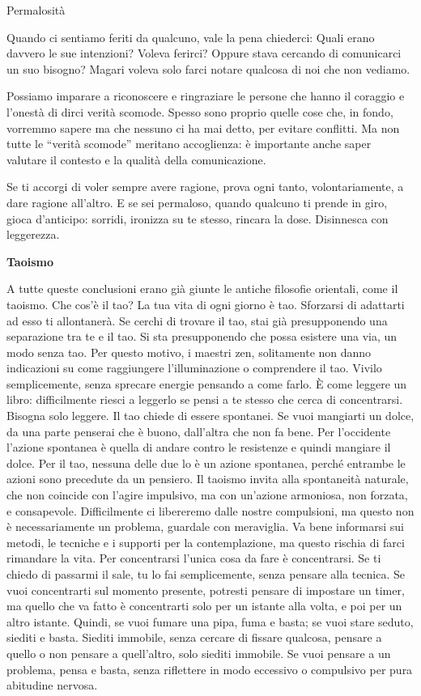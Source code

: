 \documentclass[12pt]{book} %
\begin{document}
\begin{mdframed}[linewidth=1pt]
Permalosità

Quando ci sentiamo feriti da qualcuno, vale la pena chiederci: Quali erano davvero le sue intenzioni?
Voleva ferirci? Oppure stava cercando di comunicarci un suo bisogno? Magari voleva solo farci notare qualcosa di noi che non vediamo.

Possiamo imparare a riconoscere e ringraziare le persone che hanno il coraggio e l’onestà di dirci verità scomode. Spesso sono proprio quelle cose che, in fondo, vorremmo sapere ma che nessuno ci ha mai detto, per evitare conflitti. Ma non tutte le “verità scomode” meritano accoglienza: è importante anche saper valutare il contesto e la qualità della comunicazione.

Se ti accorgi di voler sempre avere ragione, prova ogni tanto, volontariamente, a dare ragione all’altro.
E se sei permaloso, quando qualcuno ti prende in giro, gioca d’anticipo: sorridi, ironizza su te stesso, rincara la dose. Disinnesca con leggerezza.
\end{mdframed}

\textbf{Taoismo}

A tutte queste conclusioni erano già giunte le antiche filosofie orientali, come il taoismo.
Che cos'è il tao? La tua vita di ogni giorno è tao. Sforzarsi di adattarti ad esso ti allontanerà. Se cerchi di trovare il tao, stai già presupponendo una separazione tra te e il tao. Si sta presupponendo che possa esistere una via, un modo senza tao. Per questo motivo, i maestri zen, solitamente non danno indicazioni su come raggiungere l'illuminazione o comprendere il tao. Vivilo semplicemente, senza sprecare energie pensando a come farlo. È come leggere un libro: difficilmente riesci a leggerlo se pensi a te stesso che cerca di concentrarsi. Bisogna solo leggere.
Il tao chiede di essere spontanei. Se vuoi mangiarti un dolce, da una parte penserai che è buono, dall'altra che non fa bene. Per l'occidente l'azione spontanea è quella di andare contro le resistenze e quindi mangiare il dolce. Per il tao, nessuna delle due lo è un azione spontanea, perché entrambe le azioni sono precedute da un pensiero. Il taoismo invita alla spontaneità naturale, che non coincide con l’agire impulsivo, ma con un'azione armoniosa, non forzata, e consapevole. Difficilmente ci libereremo dalle nostre compulsioni, ma questo non è necessariamente un problema, guardale con meraviglia.
Va bene informarsi sui metodi, le tecniche e i supporti per la contemplazione, ma questo rischia di farci rimandare la vita. Per concentrarsi l'unica cosa da fare è concentrarsi. Se ti chiedo di passarmi il sale, tu lo fai semplicemente, senza pensare alla tecnica. Se vuoi concentrarti sul momento presente, potresti pensare di impostare un timer, ma quello che va fatto è concentrarti solo per un istante alla volta, e poi per un altro istante. Quindi, se vuoi fumare una pipa, fuma e basta; se vuoi stare seduto, siediti e basta. Siediti immobile, senza cercare di fissare qualcosa, pensare a quello o non pensare a quell'altro, solo siediti immobile. Se vuoi pensare a un problema, pensa e basta, senza riflettere in modo eccessivo o compulsivo per pura abitudine nervosa.
\end{document}
